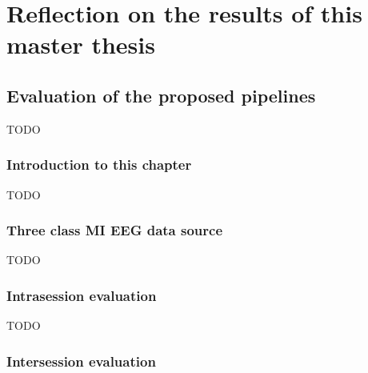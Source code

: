 


\part{Reflection on the results of this master thesis}
\label{part:reflection}

\chapter{Evaluation of the proposed pipelines}
\label{ch:evaluation}
TODO

\section{Introduction to this chapter}
\label{sec:evaluation_introduction}

TODO

\section{Three class MI EEG data source}
\label{sec:evaluation_data_source}

TODO

\section{Intrasession evaluation}
\label{sec:evaluation_intrasession}


TODO

\section{Intersession evaluation}
\label{sec:evaluation_intersession}


